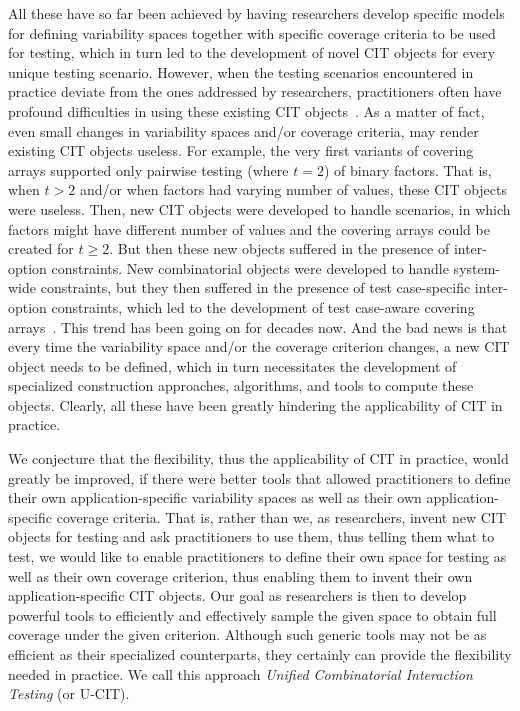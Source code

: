 \documentclass[EPiC]{easychair}
\begin{document}
All these have so far been achieved by having researchers develop  specific models for defining variability spaces together with specific coverage criteria to be used for testing, which in turn led to the development of novel CIT objects for every unique testing scenario. However, when the testing scenarios encountered in practice deviate from the ones addressed by researchers, practitioners often have profound difficulties in using these existing CIT objects~\cite{yilmaz2014moving}. As a matter of fact, even small changes in variability spaces and/or coverage criteria, may render existing CIT objects useless. For example, the very first variants of covering arrays supported only pairwise testing (where $t$$=$$2$) of binary factors. That is, when $t$$>$$2$ and/or when factors had varying number of values, these CIT objects were useless. Then, new CIT objects were developed to handle scenarios, in which factors might have different number of values and the covering arrays could be created for $t\ge2$. But then these new objects suffered in the presence of inter-option constraints. New combinatorial objects were developed to handle system-wide constraints, but they then suffered in the presence of test case-specific inter-option constraints, which led to the development of test case-aware covering arrays~\cite{yilmaz2013test}. This trend has been going on for decades now. And the bad news is that every time the variability space and/or the coverage criterion changes, a new CIT object needs to be defined, which in turn necessitates the development of specialized construction approaches, algorithms, and tools to compute these objects. Clearly, all these have been greatly hindering the applicability of CIT in practice. 

We conjecture that the flexibility, thus the applicability of CIT in practice, would greatly be improved, if there were better tools that allowed practitioners to define their own application-specific variability spaces as well as their own application-specific coverage criteria. That is, rather than we, as researchers, invent new CIT objects for testing and ask practitioners to use them, thus telling them what to test, we would like to enable practitioners to define their own space for testing as well as their own coverage criterion, thus enabling them to invent their own application-specific CIT objects. Our goal as researchers is then to develop powerful tools to efficiently and effectively sample the given space to obtain full coverage under the given criterion. Although such generic tools may not be as efficient as their specialized counterparts, they certainly can provide the flexibility needed in practice. We call this approach {\em Unified Combinatorial Interaction Testing} (or U-CIT).
\end{document}
